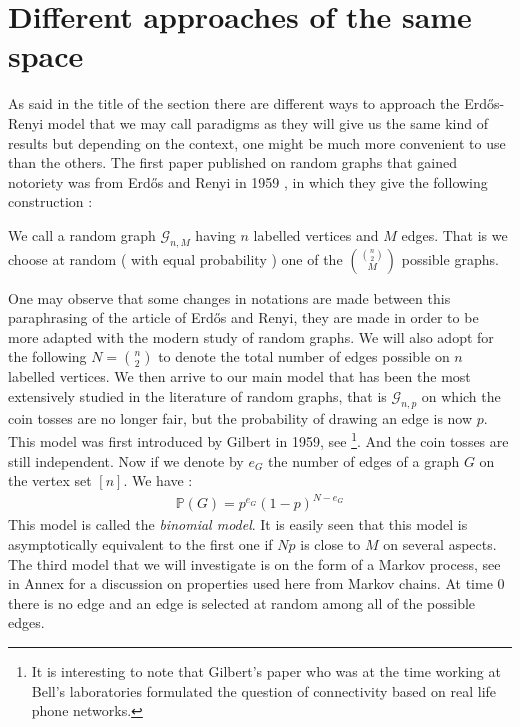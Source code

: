 \section{Different approaches of the same space}
As said in the title of the section there are different ways to approach the Erd\H{o}s-Renyi model that we may call paradigms as they will give us the same kind of results but depending on the context, one might be much more convenient to use than the others.
\newline
The first paper published on random graphs that gained notoriety was from Erd\H{o}s and Renyi in 1959 \cite{erdos59}, in which they give the following construction :
\begin{definition}
We call a random graph $\mathcal{G}_{n, M}$ having $n$ labelled vertices and $M$ edges. That is we choose at random ( with equal probability ) one of the $\binom{\binom{n}{2}}{M}$ possible graphs.
\end{definition}
One may observe that some changes in notations are made between this paraphrasing of the article of Erd\H{o}s and Renyi, they are made in order to be more adapted with the modern study of random graphs. We will also adopt for the following $N = \binom{n}{2}$ to denote the total number of edges possible on $n$ labelled vertices.
\newline
We then arrive to our main model that has been the most extensively studied in the literature of random graphs, that is $\mathcal{G}_{n, p}$ on which the coin tosses are no longer fair, but the probability of drawing an edge is now $p$.
This model was first introduced by Gilbert in 1959, see \cite{Gilbert59}\footnote{It is interesting to note that Gilbert's paper who was at the time working at Bell's laboratories formulated the question of connectivity based on real life phone networks.}.
And the coin tosses are still independent. Now if we denote by $e_G$ the number of edges of a graph $G$ on the vertex set $[n]$. We have :
\begin{align}
	\mathbb{P}(G) = p^{e_G}(1-p)^{N-e_G}
\end{align}
This model is called the \emph{binomial model}. It is easily seen that this model is asymptotically equivalent to the first one if $Np$ is close to $M$ on several aspects.
\newline
The third model that we will investigate is on the form of a Markov process, see in Annex for a discussion on properties used here from Markov chains. 
At time 0 there is no edge and an edge is selected at random among all of the possible edges. 
